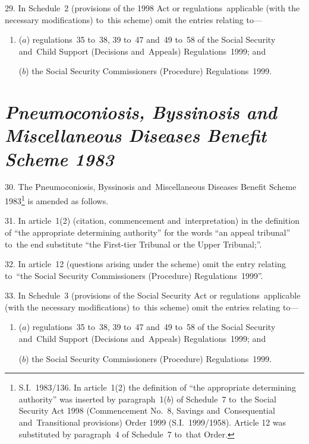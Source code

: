 \documentclass[12pt,a4paper]{article}
\begin{document}
\medskip

29.  In Schedule~2 (provisions of the 1998 Act or regulations~applicable (with the necessary modifications) to~this scheme) omit the entries relating to—
\begin{enumerate}\item[]
($a$) regulations~35 to~38, 39 to~47 and~49 to~58 of the Social Security and~Child Support (Decisions and~Appeals) Regulations~1999; and

($b$) the Social Security Commissioners (Procedure) Regulations~1999.
\end{enumerate}

\section*{\itshape\sloppy{} Pneumoconiosis, Byssinosis and Miscellaneous Diseases Benefit Scheme 1983}

30.  The Pneumoconiosis, Byssinosis and~Miscellaneous Diseases Benefit Scheme 1983\footnote{S.I.~1983/136. In article~1(2) the definition of “the appropriate determining authority” was inserted by paragraph~1($b$) of Schedule~7 to~the Social Security Act 1998 (Commencement No.~8, Savings and~Consequential and~Transitional provisions) Order 1999 (S.I.~1999/1958). Article 12 was substituted by paragraph~4 of Schedule~7 to~that Order.} is amended as follows.

\medskip

31.  In article~1(2) (citation, commencement and~interpretation) in the definition of “the appropriate determining authority” for the words “an appeal tribunal” to~the end substitute “the First-tier Tribunal or the Upper Tribunal;”.

\medskip

32.  In article~12 (questions arising under the scheme) omit the entry relating to~“the Social Security Commissioners (Procedure) Regulations~1999”.

\medskip

33.  In Schedule~3 (provisions of the Social Security Act or regulations~applicable (with the necessary modifications) to~this scheme) omit the entries relating to—
\begin{enumerate}\item[]
($a$) regulations~35 to~38, 39 to~47 and~49 to~58 of the Social Security and~Child Support (Decisions and~Appeals) Regulations~1999; and

($b$) the Social Security Commissioners (Procedure) Regulations~1999.
\end{enumerate}
\end{document}
